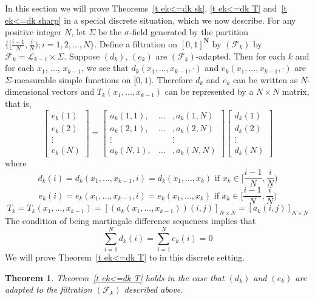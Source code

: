 \documentclass[12pt]{amsart}
\newtheorem{thm}{Theorem}
\begin{document}
In this section we will prove Theorems~\ref{t ek<=dk sk}, \ref{t ek<=dk T}
and~\ref{t ek<=dk sharp} in a special discrete situation, which we now describe.
For any positive integer $N$, let $\Sigma $ be the $\sigma
$-field generated by the partition $\{[\frac{i-1}{N},\frac{i}{N});
i=1,2,...,N\}$. Define a filtration on $[0,1]^{\mathbf N}$
by $(\mathcal{F}_k)$ by
$\mathcal{F}_k=\mathcal{L}_{k-1}\times \Sigma $. Suppose $(d_k)$,
$(e_k)$ are $(\mathcal{F}_k)$-adapted.  Then for each $k$ and for
each $x_1$, ..., $x_{k-1}$, we see that $d_k(x_1,...,x_{k-1},\cdot)$ and
$e_k(x_1, ...,x_{k-1},\cdot)$ are $\Sigma$-measurable simple
functions on $[0,1)$. Therefore $d_k$ and $e_k$ can be written as
$N$-dimensional vectors and $T_k(x_1, ...,x_{k-1})$ can be
represented by a $N\times N$ matrix, that is,
\begin{equation}
\label{[e]=[a][d]}
\left[ \begin{array}{c} e_k(1) \\ e_k(2) \\ \vdots \\ e_k(N)
\end{array} \right ]
= \left[\begin{array}{ccc} a_k(1,1), & ... & ,a_k(1,N) \\
a_k(2,1), & ... & ,a_k(2,N) \\ \vdots & & \vdots \\ a_k(N,1), &
... & ,a_k(N,N)\end{array}\right] \left[ \begin{array}{c} d_k(1)
\\ d_k(2) \\ \vdots \\ d_k(N) \end{array} \right]
\end{equation} 
where
\[d_k(i)=d_k(x_1,...,x_{k-1},i)=d_k(x_1,...,x_{k})
\mbox{ if $x_k \in [\frac{i-1}{N},\frac{i}{N})$}\]
\[e_k(i)=e_k(x_1,...,x_{k-1},i)=e_k(x_1,...,x_{k})
\mbox{ if $x_k \in [\frac{i-1}{N},\frac{i}{N})$}\]
\[T_k=T_k(x_1, ...,x_{k-1})=\left[(a_k(x_1, ...,x_{k-1}))(i,j)\right]_{N\times N}=\left[a_k(i,j)\right]_{N\times N}\]
The condition of being martingale difference sequences implies that
\[ \sum_{i=1}^N d_k(i)= \sum_{i=1}^N e_k(i)=0\]
We will prove Theorem~\ref{t ek<=dk T} to in this discrete setting.

\begin{thm}
\label{t ek<=dk T disc}
Theorem~\ref{t ek<=dk T} holds in the case that
$(d_k)$ and $(e_k)$ are
adapted to the filtration $(\mathcal F_k)$ described above.
\end{thm}
\end{document}
